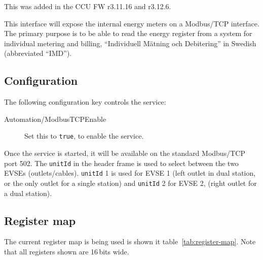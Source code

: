 \documentclass{scrartcl}
\begin{document}
This was added in the CCU FW r3.11.16 and r3.12.6.

This interface will expose the internal energy meters on a Modbus/TCP
interface. The primary purpose is to be able to read the energy register from
a system for individual metering and billing, ``Individuell Mätning och
Debitering'' in Swedish (abbreviated ``IMD'').

\subsection{Configuration}
\label{sec:modbus-configuration}

The following configuration key controls the service:
\begin{description}
\item[Automation/ModbusTCPEnable] Set this to \verb|true|, to enable the service.
\end{description}

Once the service is started, it will be available on the standard Modbus/TCP
port 502. The \verb|unitId| in the header frame is used to select between the
two EVSEs (outlets/cables). \verb|unitId| 1 is used for EVSE 1 (left outlet in
dual station, or the only outlet for a single station) and \verb|unitId| 2 for
EVSE 2, (right outlet for a dual station).

\subsection{Register map}
\label{sec:register-map}

The current register map is being used is shown it
table~\ref{tab:register-map}. Note that all registers shown are 16\,bits
wide.
\end{document}
